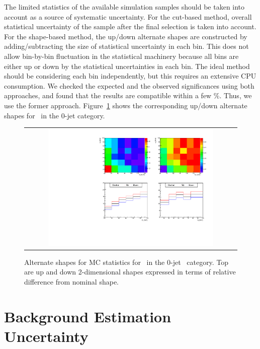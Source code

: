 The limited statistics of the available simulation samples should be taken 
into account as a source of systematic uncertainty. 
For the cut-based method, overall statistical uncertainty of the sample 
after the final selection is taken into account. 
For the shape-based method, the up/down alternate shapes are constructed 
by adding/subtracting the size of statistical uncertainty in each bin. 
This does not allow bin-by-bin fluctuation in the statistical machinery 
because all bins are either up or down by the statistical uncertainties 
in each bin. The ideal method should be considering each bin independently,
but this requires an extensive CPU consumption. 
We checked the expected and the observed significances using both approaches,
and found that the results are compatible within a few \%. 
Thus, we use the former approach. 
Figure~\ref{fig:alter_stat} shows the corresponding up/down alternate shapes
for \ggww\ in the 0-jet category. 
%
\begin{figure}[htp]
\centering
\begin{tabular}{c}
\includegraphics[width=0.8\textwidth]{figures/histo_ggWW_CMS_hww_of_0j_MVAggWWStatBounding_8TeV_0j_zoom.pdf}
\end{tabular}
\caption{Alternate shapes for MC statistics for \ggww\ in the 0-jet \DF\ category. 
         Top are up and down 2-dimensional shapes expressed in terms of relative 
         difference from nominal shape.}
\label{fig:alter_stat}
\end{figure}



\section{Background Estimation Uncertainty} 

